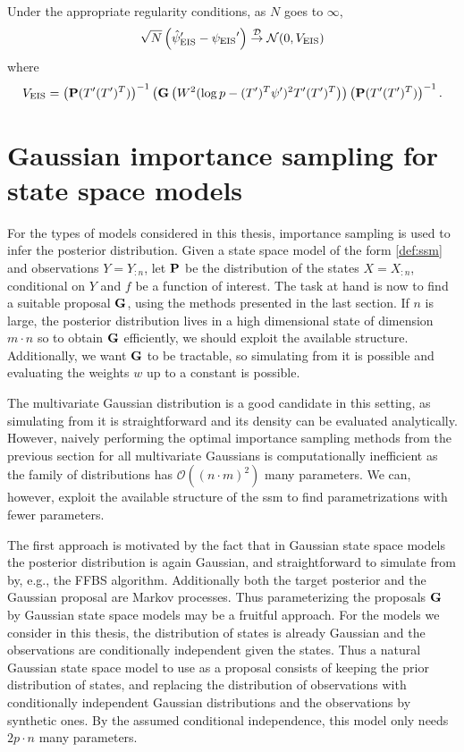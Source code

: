 \begin{theorem}
    Under the appropriate regularity conditions, as $N$ goes to $\infty$,
    $$
    \sqrt{N} \left( \hpeis' - \peis' \right) \Dto \mathcal N (0, V_{\text{EIS}})
    $$
    where 
    $$
    V_{\text{EIS}} = \left(\P (T'(T')^{T})\right)^{-1} \left(\G \left(W^{2}(\log p - (T')^{T}\psi')^{2}T'(T')^{T}\right)\right)\left(\P (T'(T')^{T})\right)^{-1}.
    $$
\end{theorem}


\section{Gaussian importance sampling for state space models}
\label{sec:gaussian_importance_sampling_for_state_space_models}

For the types of models considered in this thesis, importance sampling is used to infer the posterior distribution. Given a state space model of the form \eqref{def:ssm} and observations $Y = Y_{:n}$, let $\P$ be the distribution of the states $X=X_{:n}$, conditional on $Y$ and $f$ be a function of interest. The task at hand is now to find a suitable proposal $\G$, using the methods presented in the last section. If $n$ is large, the posterior distribution lives in a high dimensional state of dimension $m\cdot n$ so to obtain $\G$ efficiently, we should exploit the available structure. Additionally, we want $\G$ to be tractable, so simulating from it is possible and evaluating the weights $w$ up to a constant is possible. 

The multivariate Gaussian distribution is a good candidate in this setting, as simulating from it is straightforward and its density can be evaluated analytically. However, naively performing the optimal importance sampling methods from the previous section for all multivariate Gaussians is computationally inefficient as the family of distributions has $\mathcal O((n\cdot m)^{2})$ many parameters. We can, however, exploit the available structure of the \gls{ssm} to find parametrizations with fewer parameters. 

The first approach  is motivated by the fact that in Gaussian state space models the posterior distribution is again Gaussian, and straightforward to simulate from by, e.g., the FFBS  algorithm. Additionally both the target posterior and the Gaussian proposal are Markov processes. Thus parameterizing the proposals $\G$ by Gaussian state space models may be a fruitful approach.
For the models we consider in this thesis, the distribution of states is already Gaussian and the observations are conditionally independent given the states. Thus a natural Gaussian state space model to use as a proposal consists of keeping the prior distribution of states, and replacing the distribution of observations with conditionally independent Gaussian distributions and the observations by synthetic ones. By the assumed conditional independence, this model only needs $2 p\cdot n$ many parameters.

